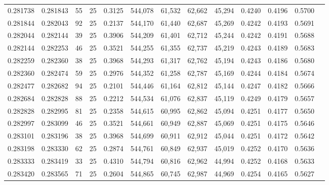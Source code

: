 \begin{tabular}{rrrrrrrrrrrrr}
0.281738 & 0.281843 &    55 &  25 &                                     0.3125 & 544,078 &  61,532 &  62,662 &  45,294 & 0.4240 & 0.4196 & 0.5700 \\
0.281844 & 0.282043 &    92 &  25 &                                     0.2137 & 544,170 &  61,440 &  62,687 &  45,269 & 0.4242 & 0.4193 & 0.5691 \\
0.282044 & 0.282144 &    39 &  25 &                                     0.3906 & 544,209 &  61,401 &  62,712 &  45,244 & 0.4242 & 0.4191 & 0.5688 \\
0.282144 & 0.282253 &    46 &  25 &                                     0.3521 & 544,255 &  61,355 &  62,737 &  45,219 & 0.4243 & 0.4189 & 0.5683 \\
0.282259 & 0.282360 &    38 &  25 &                                     0.3968 & 544,293 &  61,317 &  62,762 &  45,194 & 0.4243 & 0.4186 & 0.5680 \\
0.282360 & 0.282474 &    59 &  25 &                                     0.2976 & 544,352 &  61,258 &  62,787 &  45,169 & 0.4244 & 0.4184 & 0.5674 \\
0.282477 & 0.282682 &    94 &  25 &                                     0.2101 & 544,446 &  61,164 &  62,812 &  45,144 & 0.4247 & 0.4182 & 0.5666 \\
0.282684 & 0.282828 &    88 &  25 &                                     0.2212 & 544,534 &  61,076 &  62,837 &  45,119 & 0.4249 & 0.4179 & 0.5657 \\
0.282828 & 0.282995 &    81 &  25 &                                     0.2358 & 544,615 &  60,995 &  62,862 &  45,094 & 0.4251 & 0.4177 & 0.5650 \\
0.282997 & 0.283099 &    46 &  25 &                                     0.3521 & 544,661 &  60,949 &  62,887 &  45,069 & 0.4251 & 0.4175 & 0.5646 \\
0.283101 & 0.283196 &    38 &  25 &                                     0.3968 & 544,699 &  60,911 &  62,912 &  45,044 & 0.4251 & 0.4172 & 0.5642 \\
0.283198 & 0.283330 &    62 &  25 &                                     0.2874 & 544,761 &  60,849 &  62,937 &  45,019 & 0.4252 & 0.4170 & 0.5636 \\
0.283333 & 0.283419 &    33 &  25 &                                     0.4310 & 544,794 &  60,816 &  62,962 &  44,994 & 0.4252 & 0.4168 & 0.5633 \\
0.283420 & 0.283565 &    71 &  25 &                                     0.2604 & 544,865 &  60,745 &  62,987 &  44,969 & 0.4254 & 0.4165 & 0.5627 \\

\end{tabular}
